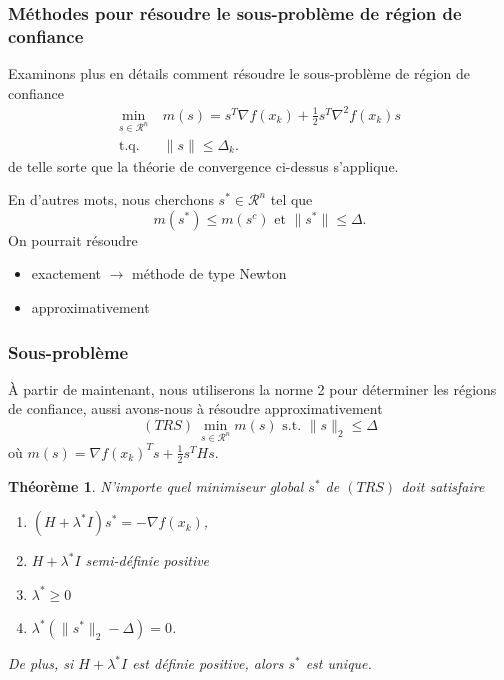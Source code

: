 \documentclass[t,usepdftitle=false]{beamer}
\newtheorem{thm}{Théorème}
\def\cR{\mathcal{R}}
\begin{document}
\begin{frame}
\frametitle{Méthodes pour résoudre le sous-problème de région de confiance}

Examinons plus en détails comment résoudre le sous-problème de région de confiance
\begin{align*}
\min_{s \in \cR^n}\ & m(s) = s^T \nabla f(x_k) +  \frac{1}{2} s^T \nabla^2 f(x_k) s \\
\mbox{t.q. } & \| s \| \leq  \Delta_k.
\end{align*}
de telle sorte que la théorie de convergence ci-dessus s'applique.

\mbox{}

En d'autres mots, nous cherchons $s^* \in \cR^n$ tel que
$$
m(s^*) \leq m(s^c) \mbox{ et } \| s^* \| \leq \Delta.
$$
On pourrait résoudre
\begin{itemize}
\item
exactement $\rightarrow$ méthode de type Newton
\item
approximativement
\end{itemize}

\end{frame}

\begin{frame}
\frametitle{Sous-problème}

À partir de maintenant, nous utiliserons la norme 2 pour déterminer les régions de confiance, aussi avons-nous à résoudre approximativement
$$
(TRS)\ \min_{s \in \cR^n} m(s) \mbox{ s.t. } \| s \|_2 \leq \Delta
$$
où $m(s) = \nabla f(x_k)^Ts + \frac{1}{2} s^T H s$.

\begin{thm}
N'importe quel minimiseur global $s^*$ de $(TRS)$ doit satisfaire
\begin{enumerate}
\item 
$(H + \lambda^* I)s^* = - \nabla f(x_k)$,
\item
$H + \lambda^* I$ semi-définie positive
\item
$\lambda^* \geq 0$
\item
$ \lambda^*(\| s^* \|_2 - \Delta ) = 0$.
\end{enumerate}
De plus, si $H + \lambda^* I$ est définie positive, alors $s^*$ est unique.
\end{thm}

\end{frame}
\end{document}
